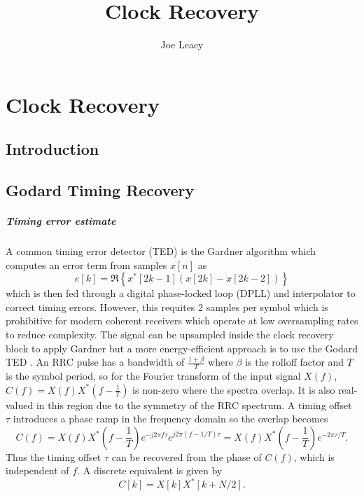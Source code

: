 \documentclass[12pt,a4paper]{article}
\title{Clock Recovery}
\author{Joe Leacy}
\begin{document}
\maketitle

\chapter{Clock Recovery}
\section{Introduction}
\section{Godard Timing Recovery}
\paragraph{Timing error estimate}
A common timing error detector (TED) is the Gardner algorithm which computes an error term from samples $x[n]$ as \cite{Zhou;10}
\begin{equation}
    e[k] = \Re\left\{x^*[2k-1](x[2k]-x[2k-2])\right\}
\end{equation}
which is then fed through a digital phase-locked loop (DPLL) and interpolator to correct timing errors. However, this requites 2 samples per symbol which is prohibitive for modern coherent receivers which operate at low oversampling rates to reduce complexity. The signal can be upsampled inside the clock recovery block to apply Gardner but a more energy-efficient approach is to use the Godard TED \cite{Godard;78}. An RRC pulse has a bandwidth of $\frac{1+\beta}{T}$ where $\beta$ is the rolloff factor and $T$ is the symbol period, so for the Fourier transform of the input signal $X(f)$, $C(f) = X(f)X^*(f-\frac{1}{T})$ is non-zero where the spectra overlap. It is also real-valued in this region due to the symmetry of the RRC spectrum. A timing offset $\tau$ introduces a phase ramp in  the frequency domain so the overlap becomes
\begin{equation}
    C(f) = X(f)X^*(f-\frac{1}{T})e^{-j2\pi f\tau}e^{j2\pi (f-1/T)\tau} = X(f)X^*(f-\frac{1}{T})e^{-2\pi\tau / T}.
\end{equation}
Thus the timing offset $\tau$ can be recovered from the phase of $C(f)$, which is independent of $f$. A discrete equivalent is given by \cite{Han;11}
\begin{equation}
    C[k] = X[k]X^*[k+N/2].
\end{equation}
\end{document}
